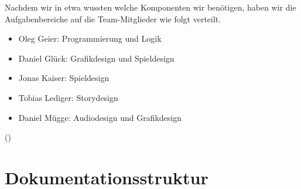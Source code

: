 Nachdem wir in etwa wussten welche Komponenten wir benötigen, haben wir die Aufgabenbereiche auf die Team-Mitglieder wie folgt verteilt.

\begin{itemize}

\item Oleg Geier: Programmierung und Logik

\item Daniel Glück: Grafikdesign und Spieldesign

\item Jonas Kaiser: Spieldesign

\item Tobias Lediger: Storydesign

\item Daniel Mügge: Audiodesign und Grafikdesign

\end{itemize}
()



\section{Dokumentationsstruktur}



